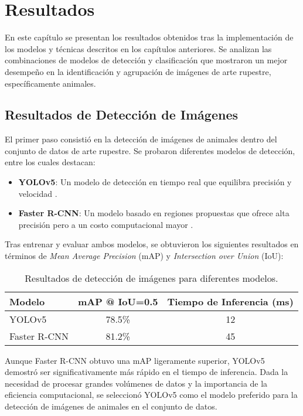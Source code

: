\chapter{Resultados}

En este capítulo se presentan los resultados obtenidos tras la implementación de los modelos y técnicas descritos en los capítulos anteriores. Se analizan las combinaciones de modelos de detección y clasificación que mostraron un mejor desempeño en la identificación y agrupación de imágenes de arte rupestre, específicamente animales.

\section{Resultados de Detección de Imágenes}

El primer paso consistió en la detección de imágenes de animales dentro del conjunto de datos de arte rupestre. Se probaron diferentes modelos de detección, entre los cuales destacan:

\begin{itemize}
    \item \textbf{YOLOv5}: Un modelo de detección en tiempo real que equilibra precisión y velocidad \cite{jocher2020ultralytics}.
    \item \textbf{Faster R-CNN}: Un modelo basado en regiones propuestas que ofrece alta precisión pero a un costo computacional mayor \cite{ren2015faster}.
\end{itemize}

Tras entrenar y evaluar ambos modelos, se obtuvieron los siguientes resultados en términos de \textit{Mean Average Precision} (mAP) y \textit{Intersection over Union} (IoU):

\begin{table}[!ht]
    \centering
    \begin{tabular}{lcc}
        \hline
        \textbf{Modelo} & \textbf{mAP @ IoU=0.5} & \textbf{Tiempo de Inferencia (ms)} \\
        \hline
        YOLOv5 & 78.5\% & 12 \\
        Faster R-CNN & 81.2\% & 45 \\
        \hline
    \end{tabular}
    \caption{Resultados de detección de imágenes para diferentes modelos.}
    \label{tab}
\end{table}

Aunque Faster R-CNN obtuvo una mAP ligeramente superior, YOLOv5 demostró ser significativamente más rápido en el tiempo de inferencia. Dada la necesidad de procesar grandes volúmenes de datos y la importancia de la eficiencia computacional, se seleccionó YOLOv5 como el modelo preferido para la detección de imágenes de animales en el conjunto de datos.

